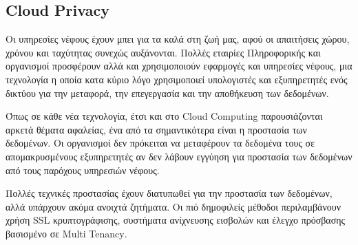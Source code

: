 \subsection{\textlatin{Cloud Privacy}}

Οι υπηρεσίες νέφους έχουν μπει για τα καλά στη ζωή μας, αφού οι απαιτήσεις χώρου, χρόνου και ταχύτητας συνεχώς αυξάνονται. Πολλές εταιρίες Πληροφορικής και οργανισμοί προσφέρουν αλλά και χρησιμοποιούν εφαρμογές και υπηρεσίες νέφους, μια τεχνολογία η οποία κατα κύριο λόγο χρησιμοποιεί υπολογιστές και εξυπηρετητές ενός δικτύου για την μεταφορά, την επεγεργασία και την αποθήκευση των δεδομένων.

Όπως σε κάθε νέα τεχνολογία, έτσι και στο \textlatin{Cloud Computing} παρουσιάζονται αρκετά θέματα αφαλείας, ένα από τα σημαντικότερα είναι η προστασία των δεδομένων. Οι οργανισμοί δεν πρόκειται να μεταφέρουν τα δεδομένα τους σε απομακρυσμένους εξυπηρετητές αν δεν λάβουν εγγύηση για προστασία των δεδομένων από τους παρόχους υπηρεσιών νέφους. 

Πολλές τεχνικές προστασίας έχουν διατυπωθεί για την προστασία των δεδομένων, αλλά υπάρχουν ακόμα ανοιχτά ζητήματα. Οι πιό δημοφιλείς μέθοδοι περιλαμβάνουν χρήση \textlatin{SSL} κρυπτογράφισης, συστήματα ανίχνευσης εισβολών και έλεγχο πρόσβασης βασισμένο σε \textlatin{Multi Tenancy}.
